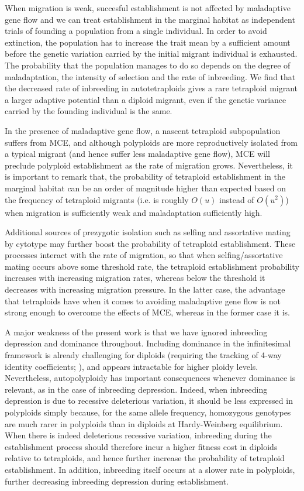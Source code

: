 \documentclass[12pt,a4paper]{article}
\begin{document}
When migration is weak, succesful establishment is not affected by
maladaptive gene flow and we can treat establishment in the marginal habitat as
independent trials of founding a population from a single individual.
In order to avoid extinction, the population has to increase the trait mean
by a sufficient amount before the genetic variation carried by the initial
migrant individual is exhausted.
The probability that the population manages to do so depends on the degree of
maladaptation, the intensity of selection and the rate of inbreeding.
We find that the decreased rate of inbreeding in autotetraploids gives a
rare tetraploid migrant a larger adaptive potential than a diploid migrant,
even if the genetic variance carried by the founding individual is the same.

In the presence of maladaptive gene flow, a nascent tetraploid subpopulation
suffers from MCE, and although polyploids are more reproductively isolated from
a typical migrant (and hence suffer less maladaptive gene flow), MCE will
preclude polyploid establishment as the rate of migration grows.
Nevertheless, it is important to remark that, the probability of tetraploid
establishment in the marginal habitat can be an order of magnitude higher than
expected based on the frequency of tetraploid migrants (i.e. is roughly $O(u)$
instead of $O(u^2)$) when migration is sufficiently weak and maladaptation
sufficiently high.

Additional sources of prezygotic isolation such as selfing and assortative
mating by cytotype may further boost the probability of tetraploid
establishment.
These processes interact with the rate of migration, so that when
selfing/assortative mating occurs above some threshold rate, the tetraploid
establishment probability increases with increasing migration rates, whereas
below the threshold it decreases with increasing migration pressure.
In the latter case, the advantage that tetraploids have when it comes to
avoiding maladaptive gene flow is not strong enough to overcome the effects of
MCE, whereas in the former case it is.

A major weakness of the present work is that we have ignored inbreeding
depression and dominance throughout.
Including dominance in the infinitesimal framework is already challenging for
diploids (requiring the tracking of 4-way identity coefficients;
\cite{barton2023}), and appears intractable for higher ploidy levels.
Nevertheless, autopolyploidy has important consequences whenever dominance is
relevant, as in the case of inbreeding depression.
Indeed, when inbreeding depression is due to recessive deleterious variation,
it should be less expressed in polyploids simply because, for the same allele
frequency, homozygous genotypes are much rarer in polyploids than in diploids
at Hardy-Weinberg equilibrium.
When there is indeed deleterious recessive variation, inbreeding during the
establishment process should therefore incur a higher fitness cost in diploids
relative to tetraploids, and hence further increase the probability of
tetraploid establishment.
In addition, inbreeding itself occurs at a slower rate in polyploids, further
decreasing inbreeding depression during establishment.
\end{document}
